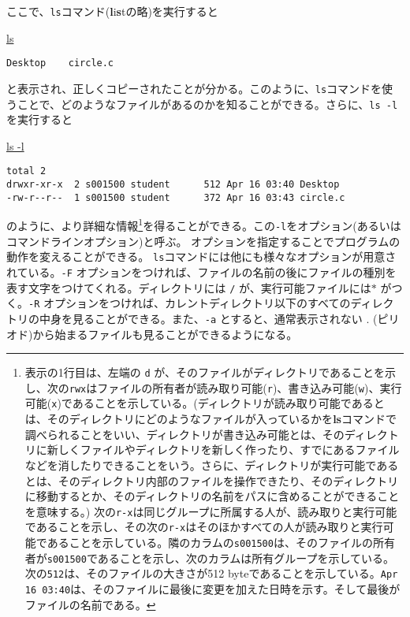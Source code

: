 ここで、\texttt{ls}コマンド(\textbf{l}i\textbf{s}tの略)を実行すると
\begin{commandline2}
    \prompt \underline{ls}
    \begin{verbatim}
Desktop    circle.c
\end{verbatim}
\end{commandline2} \noindent
と表示され、正しくコピーされたことが分かる。このように、\texttt{ls}コマンドを使うことで、どのようなファイルがあるのかを知ることができる。さらに、\texttt{ls -l}を実行すると
\begin{commandline2}
    \prompt \underline{ls -l}
    \vspace*{-.8em}
    \begin{verbatim}
total 2
drwxr-xr-x  2 s001500 student      512 Apr 16 03:40 Desktop
-rw-r--r--  1 s001500 student      372 Apr 16 03:43 circle.c
\end{verbatim}
\end{commandline2} \noindent
のように、より詳細な情報\footnote{表示の1行目は、左端の \texttt{d} が、そのファイルがディレクトリであることを示し、次の\texttt{rwx}はファイルの所有者が読み取り可能(\texttt{r})、書き込み可能(\texttt{w})、実行可能(\texttt{x})であることを示している。(ディレクトリが読み取り可能であるとは、そのディレクトリにどのようなファイルが入っているかを\textbf{ls}コマンドで調べられることをいい、ディレクトリが書き込み可能とは、そのディレクトリに新しくファイルやディレクトリを新しく作ったり、すでにあるファイルなどを消したりできることをいう。さらに、ディレクトリが実行可能であるとは、そのディレクトリ内部のファイルを操作できたり、そのディレクトリに移動するとか、そのディレクトリの名前をパスに含めることができることを意味する。) 次の\texttt{r-x}は同じグループに所属する人が、読み取りと実行可能であることを示し、その次の\texttt{r-x}はそのほかすべての人が読み取りと実行可能であることを示している。隣のカラムの\texttt{s001500}は、そのファイルの所有者が\texttt{s001500}であることを示し、次のカラムは所有グループを示している。次の\texttt{512}は、そのファイルの大きさが512 byteであることを示している。\texttt{Apr 16 03:40}は、そのファイルに最後に変更を加えた日時を示す。そして最後がファイルの名前である。}を得ることができる。この\texttt{-l}をオプション(あるいはコマンドラインオプション)と呼ぶ。
オプションを指定することでプログラムの動作を変えることができる。
\texttt{ls}コマンドには他にも様々なオプションが用意されている。\texttt{-F} オプションをつければ、ファイルの名前の後にファイルの種別を表す文字をつけてくれる。ディレクトリには \texttt{/} が、実行可能ファイルには\texttt{\( \ast\)} がつく。\texttt{-R} オプションをつければ、カレントディレクトリ以下のすべてのディレクトリの中身を見ることができる。また、\texttt{-a} とすると、通常表示されない . (ピリオド)から始まるファイルも見ることができるようになる。

